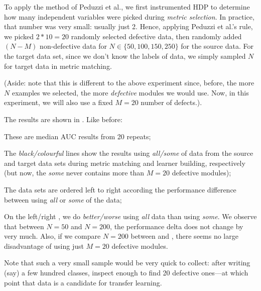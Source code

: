   To apply the method of Peduzzi et al., we first instrumented HDP to determine how many
  independent variables were picked during {\em metric  selection}. In practice, that number
  was very small: usually just 2. Hence, applying  Peduzzi et al.'s rule, we picked $2*10=20$
  randomly selected defective data, then randomly added $(N-M)$ non-defective data for
  $N\in \{50,100,150,250\}$ for the source data. For the target data set, since we don't
  know the labels of data, we simply sampled $N$ for target data in metric matching.

  (Aside: note that this is different to the above experiment since, before, the more $N$ examples
  we selected, the more {\em defective} modules we would use. Now, in this experiment, we will also
  use a fixed $M=20$ number of defects.).

  The results are shown in . Like before:
  \bi
  \item These are median AUC results from 20 repeats;
\item
  The {\em black/colourful} lines show the results using {\em all/some} of  data from
  the source and target data sets during metric matching and learner building, respectively
  (but now, the {\em some} never contains more than $M=20$ defective modules);
\item
  The data sets are ordered left to right according
  the performance difference between using
   {\em all} or {\em some} of the data;
   \item
     On the left/right ,  we do {\em better/worse} using
  {\em all} data than using {\em some}.
  \ei
  We observe that between $N=50$ and $N=200$, the performance delta
  does not change by very much. Also, if we compare $N=200$ between 
  and , there seems no large disadvantage of using just
  $M=20$ defective modules.

  Note that such a very small sample would be very quick to collect: after writing (say) a few
  hundred classes, inspect enough to find 20 defective ones---at which point that data is a candidate
  for transfer learning.
